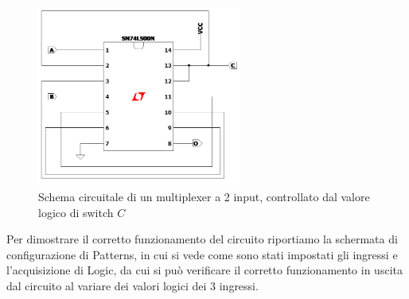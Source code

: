 \documentclass[10pt, a4paper, italian]{article}
\begin{document}
\begin{figure}[htbp]
    \centering
    \includegraphics[width=0.6\textwidth]{NAND_MP}
    \caption{Schema circuitale di un multiplexer a 2 input, controllato dal
    valore logico di switch $C$}
    \label{fig: mult_circ}
\end{figure}

Per dimostrare il corretto funzionamento del circuito riportiamo la schermata
di configurazione di Patterns, in cui si vede come sono stati impostati gli
ingressi e l'acquisizione di Logic, da cui si può verificare il corretto
funzionamento in uscita dal circuito al variare dei valori logici dei 3
ingressi.
\end{document}
